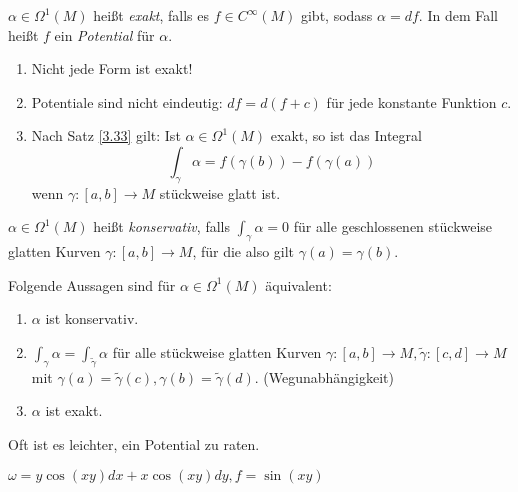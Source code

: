 \begin{defn}\lecture
	$ \alpha \in \Omega^1(M) $ heißt \emph{exakt}, falls es $f \in C^\infty(M)$ gibt, sodass $ \alpha = df $. In dem Fall heißt $f$ ein \emph{Potential} für $\alpha$.
\end{defn}

\begin{rem*}
	\begin{enumerate}[label={\roman*})]
		\item Nicht jede Form ist exakt!
		\item Potentiale sind nicht eindeutig: $ df = d(f+c) $ für jede konstante Funktion $c$.
		\item Nach Satz \ref{3.33} gilt: Ist $\alpha \in \Omega^1(M)$ exakt, so ist das Integral
			\[ \int_\gamma \alpha = f(\gamma(b)) - f(\gamma(a)) \]
			wenn $\gamma: [a,b] \to M$ stückweise glatt ist.
	\end{enumerate}
\end{rem*}

\begin{defn}
	$ \alpha \in \Omega^1(M) $ heißt \emph{konservativ}, falls $ \int_\gamma \alpha = 0 $ für alle geschlossenen stückweise glatten Kurven $ \gamma: [a,b] \to M $, für die also gilt $\gamma(a) = \gamma (b)$.
\end{defn}

\begin{thm}
	Folgende Aussagen sind für $ \alpha \in \Omega^1(M) $ äquivalent:
	\begin{enumerate}[label={\roman*})]
		\item $\alpha$ ist konservativ.
		\item $\int_\gamma \alpha = \int_{\tilde{\gamma}} \alpha$ für alle stückweise glatten Kurven $ \gamma: [a,b] \to M, \tilde{\gamma}: [c,d] \to M $ mit $ \gamma(a) = \tilde{\gamma}(c), \gamma(b) = \tilde{\gamma}(d). $ (Wegunabhängigkeit)
		\item $\alpha$ ist exakt.
	\end{enumerate}
\end{thm}

\begin{rem*}
	Oft ist es leichter, ein Potential zu raten.
	\begin{exmp*}
		$\omega = y\cos(xy) dx + x\cos(xy)dy, f = \sin(xy)$
	\end{exmp*}
\end{rem*}

